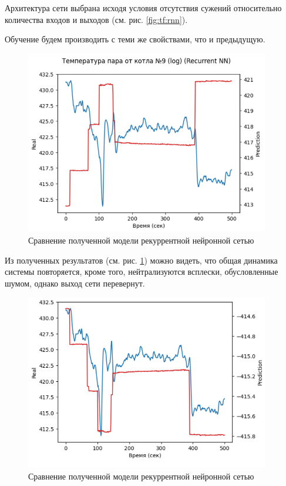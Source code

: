 Архитектура сети выбрана исходя условия отсутствия сужений относительно
количества входов и выходов (см. рис. \ref{fig:tf:rnn}). 

Обучение будем производить с теми же свойствами, что и предыдущую. 

\begin{figure}[H]
  \begin{center}
    \includegraphics[width=0.95\textwidth]{figures/tensorflow/rnn_compare.png}
  \end{center}
  \caption{Сравнение полученной модели рекуррентной нейронной
  сетью}\label{fig:tf:cmp:rnn}
\end{figure}

Из полученных результатов (см. рис. \ref{fig:tf:cmp:rnn}) можно видеть, что
общая динамика системы повторяется, кроме того, нейтрализуются всплески,
обусловленные шумом, однако выход сети перевернут. 

\begin{figure}[H]
  \begin{center}
    \includegraphics[width=0.95\textwidth]{figures/tensorflow/rnn_compare_reversed.png}
  \end{center}
  \caption{Сравнение полученной модели рекуррентной нейронной
  сетью}\label{fig:tf:cmp:rnn:reversed}
\end{figure}


